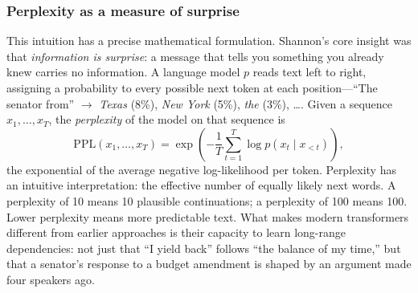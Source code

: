 \documentclass[12pt]{article}
\newcommand{\PPL}{\text{PPL}}
\begin{document}
\subsubsection*{Perplexity as a measure of surprise}
This intuition has a precise mathematical formulation. Shannon's \citeyearpar{shannon1948} core insight was that \textit{information is surprise}: a message that tells you something you already knew carries no information. A language model $p$ reads text left to right, assigning a probability to every possible next token at each position---``The senator from'' $\rightarrow$ \textit{Texas} (8\%), \textit{New York} (5\%), \textit{the} (3\%), \ldots. Given a sequence $x_1, \ldots, x_T$, the \textit{perplexity} of the model on that sequence is
\begin{equation}
\PPL(x_1, \ldots, x_T) = \exp\!\left(-\frac{1}{T}\sum_{t=1}^{T} \log p(x_t \mid x_{<t})\right),
\label{eq:ppl}
\end{equation}
the exponential of the average negative log-likelihood per token. Perplexity has an intuitive interpretation: the effective number of equally likely next words. A perplexity of 10 means 10 plausible continuations; a perplexity of 100 means 100. Lower perplexity means more predictable text. What makes modern transformers \citep{vaswani2017} different from earlier approaches is their capacity to learn long-range dependencies: not just that ``I yield back'' follows ``the balance of my time,'' but that a senator's response to a budget amendment is shaped by an argument made four speakers ago.
\end{document}
